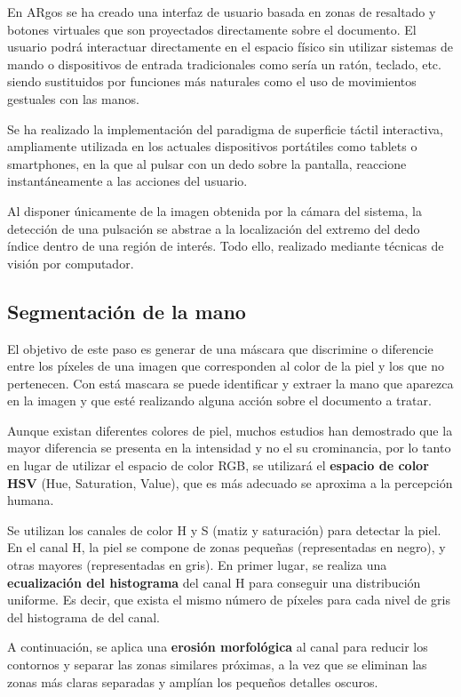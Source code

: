 En ARgos se ha creado una interfaz de usuario basada en zonas de
resaltado y botones virtuales que son proyectados directamente sobre
el documento. El usuario podrá interactuar directamente en el espacio físico sin utilizar sistemas de mando o dispositivos de entrada tradicionales como sería un ratón,
teclado, etc. siendo sustituidos por funciones más naturales como el
uso de movimientos gestuales con las manos.

Se ha realizado la implementación del paradigma de superficie táctil interactiva,
ampliamente utilizada en los actuales dispositivos portátiles como
tablets o smartphones, en la que al pulsar con un dedo sobre la
pantalla, reaccione instantáneamente a las acciones del usuario.

Al disponer únicamente de la imagen obtenida por la cámara del
sistema, la detección de una pulsación se abstrae a la localización
del extremo del dedo índice dentro de una región de interés. Todo
ello, realizado mediante técnicas de visión por computador.

\subsection{Segmentación de la mano}
El objetivo de este paso es generar de una máscara que discrimine o
diferencie entre los píxeles de una imagen que corresponden al color
de la piel y los que no pertenecen. Con está mascara se puede identificar y extraer la mano que
aparezca en la imagen y que esté realizando alguna acción sobre el documento a tratar.


Aunque existan diferentes colores de piel, muchos estudios han
demostrado que la mayor diferencia se presenta en la intensidad y no
el su crominancia, por lo tanto en lugar de utilizar el espacio de
color RGB, se utilizará el  \textbf{espacio de color HSV} (Hue, Saturation,
Value), que es más adecuado se aproxima a la percepción humana.


Se utilizan los canales de color H y S (matiz y saturación) para
detectar la piel. En el canal H, la piel se compone de zonas pequeñas
(representadas en negro), y otras mayores (representadas en gris). En
primer lugar, se realiza una \textbf{ecualización del histograma} del canal H
para conseguir una distribución uniforme. Es decir, que exista el
mismo número de píxeles para cada nivel de gris del histograma de del
canal.

A continuación, se aplica una \textbf{erosión morfológica} al canal para reducir los
contornos y separar las zonas similares próximas, a la vez que se
eliminan las zonas más claras separadas y amplían los pequeños detalles
oscuros.

